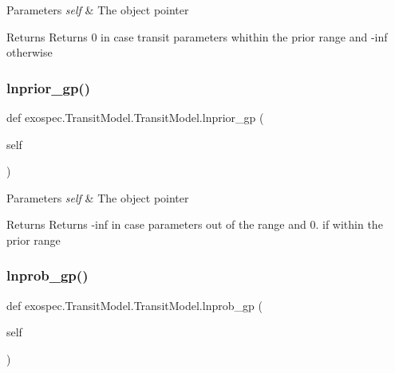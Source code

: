 \begin{DoxyParams}{Parameters}
{\em self} & The object pointer \\
\hline
\end{DoxyParams}
\begin{DoxyReturn}{Returns}
Returns 0 in case transit parameters whithin the prior range and -\/inf otherwise 
\end{DoxyReturn}
\mbox{\label{classexospec_1_1_transit_model_1_1_transit_model_a2c0c838bfee6bdeac30082ebc6cc9517}} 
\subsubsection{\texorpdfstring{lnprior\+\_\+gp()}{lnprior\_gp()}}
{\footnotesize\ttfamily def exospec.\+Transit\+Model.\+Transit\+Model.\+lnprior\+\_\+gp (\begin{DoxyParamCaption}\item[{}]{self }\end{DoxyParamCaption})}


\begin{DoxyParams}{Parameters}
{\em self} & The object pointer \\
\hline
\end{DoxyParams}
\begin{DoxyReturn}{Returns}
Returns -\/inf in case parameters out of the range and 0. if within the prior range 
\end{DoxyReturn}
\mbox{\label{classexospec_1_1_transit_model_1_1_transit_model_aa791197371e843567a9fdb8565abf154}} 
\subsubsection{\texorpdfstring{lnprob\+\_\+gp()}{lnprob\_gp()}}
{\footnotesize\ttfamily def exospec.\+Transit\+Model.\+Transit\+Model.\+lnprob\+\_\+gp (\begin{DoxyParamCaption}\item[{}]{self }\end{DoxyParamCaption})}



